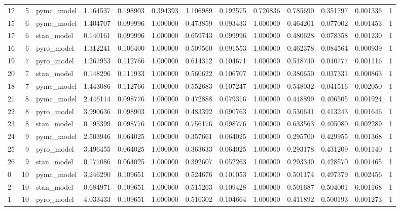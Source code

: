\begin{tabular}{lrlrrrrrrrrrr}
12 & 5 & pymc_model & 1.164537 & 0.198903 & 0.394393 & 1.106989 & 0.192575 & 0.726836 & 0.785690 & 0.351797 & 0.001336 & 1 \\
15 & 6 & pymc_model & 1.404707 & 0.099996 & 1.000000 & 0.473859 & 0.093433 & 1.000000 & 0.464201 & 0.077002 & 0.001453 & 1 \\
17 & 6 & stan_model & 0.140161 & 0.099996 & 1.000000 & 0.659743 & 0.099996 & 1.000000 & 0.480628 & 0.078358 & 0.001230 & 1 \\
16 & 6 & pyro_model & 1.312241 & 0.106400 & 1.000000 & 0.509560 & 0.091553 & 1.000000 & 0.462378 & 0.084564 & 0.000939 & 1 \\
19 & 7 & pyro_model & 1.267953 & 0.112766 & 1.000000 & 0.614312 & 0.104671 & 1.000000 & 0.518740 & 0.040777 & 0.001116 & 1 \\
20 & 7 & stan_model & 0.148296 & 0.111933 & 1.000000 & 0.560622 & 0.106707 & 1.000000 & 0.380650 & 0.037331 & 0.000863 & 1 \\
18 & 7 & pymc_model & 1.443086 & 0.112766 & 1.000000 & 0.552683 & 0.107247 & 1.000000 & 0.548032 & 0.041516 & 0.002050 & 1 \\
21 & 8 & pymc_model & 2.446114 & 0.098776 & 1.000000 & 0.472888 & 0.079316 & 1.000000 & 0.448899 & 0.406505 & 0.001924 & 1 \\
22 & 8 & pyro_model & 3.990636 & 0.098903 & 1.000000 & 0.483392 & 0.090763 & 1.000000 & 0.530641 & 0.413243 & 0.001646 & 1 \\
23 & 8 & stan_model & 0.195399 & 0.098776 & 1.000000 & 0.756176 & 0.098776 & 1.000000 & 0.633563 & 0.405080 & 0.002289 & 1 \\
24 & 9 & pymc_model & 2.503946 & 0.064025 & 1.000000 & 0.357661 & 0.064025 & 1.000000 & 0.295700 & 0.429955 & 0.001368 & 1 \\
25 & 9 & pyro_model & 3.496455 & 0.064025 & 1.000000 & 0.363633 & 0.064025 & 1.000000 & 0.293178 & 0.431209 & 0.001140 & 1 \\
26 & 9 & stan_model & 0.177086 & 0.064025 & 1.000000 & 0.392607 & 0.052263 & 1.000000 & 0.293340 & 0.428570 & 0.001465 & 1 \\
0 & 10 & pymc_model & 3.246290 & 0.109651 & 1.000000 & 0.524676 & 0.101053 & 1.000000 & 0.501174 & 0.497379 & 0.002456 & 1 \\
2 & 10 & stan_model & 0.684971 & 0.109651 & 1.000000 & 0.515263 & 0.109428 & 1.000000 & 0.501687 & 0.504001 & 0.001168 & 1 \\
1 & 10 & pyro_model & 4.033433 & 0.109651 & 1.000000 & 0.516302 & 0.104664 & 1.000000 & 0.411892 & 0.500193 & 0.001273 & 1 \\

\end{tabular}
